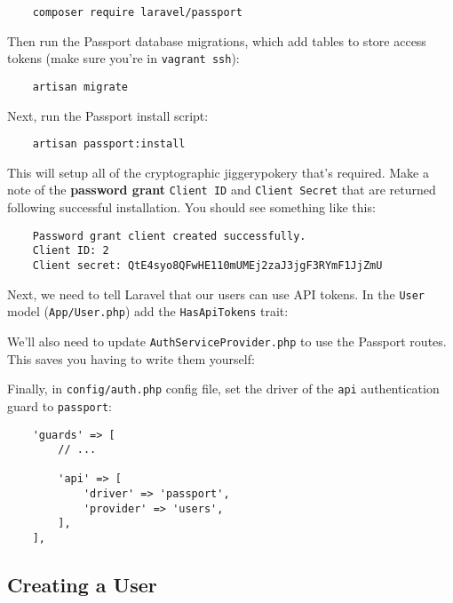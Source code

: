 \begin{verbatim}
    composer require laravel/passport
\end{verbatim}

Then run the Passport database migrations, which add tables to store access tokens (make sure you're in \texttt{vagrant ssh}):

\begin{verbatim}
    artisan migrate
\end{verbatim}

Next, run the Passport install script:

\begin{verbatim}
    artisan passport:install
\end{verbatim}

This will setup all of the cryptographic jiggerypokery that's required. Make a note of the \textbf{password grant} \texttt{Client ID} and \texttt{Client Secret} that are returned following successful installation. You should see something like this:

\begin{verbatim}
    Password grant client created successfully.
    Client ID: 2
    Client secret: QtE4syo8QFwHE110mUMEj2zaJ3jgF3RYmF1JjZmU
\end{verbatim}

Next, we need to tell Laravel that our users can use API tokens. In the \texttt{User} model (\texttt{App/User.php}) add the \texttt{HasApiTokens} trait:



We'll also need to update \texttt{AuthServiceProvider.php} to use the Passport routes. This saves you having to write them yourself:



Finally, in \texttt{config/auth.php} config file, set the driver of the \texttt{api} authentication guard to \texttt{passport}:

\begin{verbatim}
    'guards' => [
        // ...

        'api' => [
            'driver' => 'passport',
            'provider' => 'users',
        ],
    ],
\end{verbatim}

\pagebreak

\subsection{Creating a User}

